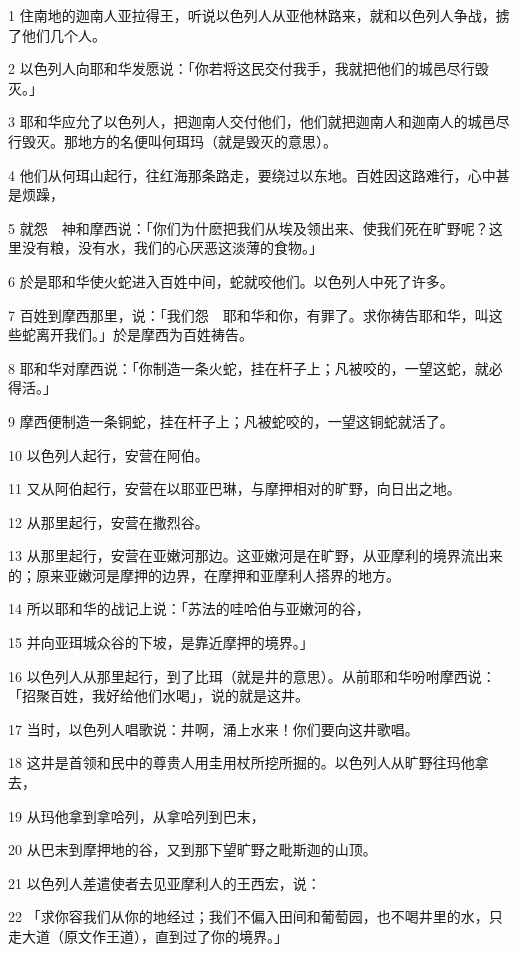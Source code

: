 \par 1 住南地的迦南人亚拉得王，听说以色列人从亚他林路来，就和以色列人争战，掳了他们几个人。
\par 2 以色列人向耶和华发愿说：「你若将这民交付我手，我就把他们的城邑尽行毁灭。」
\par 3 耶和华应允了以色列人，把迦南人交付他们，他们就把迦南人和迦南人的城邑尽行毁灭。那地方的名便叫何珥玛（就是毁灭的意思）。
\par 4 他们从何珥山起行，往红海那条路走，要绕过以东地。百姓因这路难行，心中甚是烦躁，
\par 5 就怨　神和摩西说：「你们为什麽把我们从埃及领出来、使我们死在旷野呢？这里没有粮，没有水，我们的心厌恶这淡薄的食物。」
\par 6 於是耶和华使火蛇进入百姓中间，蛇就咬他们。以色列人中死了许多。
\par 7 百姓到摩西那里，说：「我们怨　耶和华和你，有罪了。求你祷告耶和华，叫这些蛇离开我们。」於是摩西为百姓祷告。
\par 8 耶和华对摩西说：「你制造一条火蛇，挂在杆子上；凡被咬的，一望这蛇，就必得活。」
\par 9 摩西便制造一条铜蛇，挂在杆子上；凡被蛇咬的，一望这铜蛇就活了。
\par 10 以色列人起行，安营在阿伯。
\par 11 又从阿伯起行，安营在以耶亚巴琳，与摩押相对的旷野，向日出之地。
\par 12 从那里起行，安营在撒烈谷。
\par 13 从那里起行，安营在亚嫩河那边。这亚嫩河是在旷野，从亚摩利的境界流出来的；原来亚嫩河是摩押的边界，在摩押和亚摩利人搭界的地方。
\par 14 所以耶和华的战记上说：「苏法的哇哈伯与亚嫩河的谷，
\par 15 并向亚珥城众谷的下坡，是靠近摩押的境界。」
\par 16 以色列人从那里起行，到了比珥（就是井的意思）。从前耶和华吩咐摩西说：「招聚百姓，我好给他们水喝」，说的就是这井。
\par 17 当时，以色列人唱歌说：井啊，涌上水来！你们要向这井歌唱。
\par 18 这井是首领和民中的尊贵人用圭用杖所挖所掘的。以色列人从旷野往玛他拿去，
\par 19 从玛他拿到拿哈列，从拿哈列到巴末，
\par 20 从巴末到摩押地的谷，又到那下望旷野之毗斯迦的山顶。
\par 21 以色列人差遣使者去见亚摩利人的王西宏，说：
\par 22 「求你容我们从你的地经过；我们不偏入田间和葡萄园，也不喝井里的水，只走大道（原文作王道），直到过了你的境界。」

